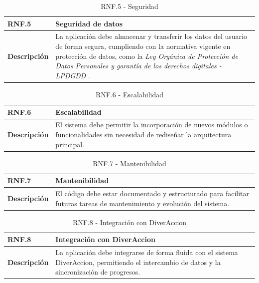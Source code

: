 \begin{table}[H]
\centering
\begin{tabularx}{\textwidth}{|X|p{}|}
\hline
\textbf{RNF.5} & Seguridad de datos \\
\hline
\textbf{Descripción} & La aplicación debe almacenar y transferir los datos del usuario de forma segura, cumpliendo con la normativa vigente en protección de datos, como la \textit{Ley Orgánica de Protección de Datos Personales y garantía de los derechos digitales - LPDGDD} \parencite{rgpd}. \\
\hline
\end{tabularx}
\caption{RNF.5 - Seguridad}
\end{table}

\begin{table}[H]
\centering
\begin{tabularx}{\textwidth}{|X|p{}|}
\hline
\textbf{RNF.6} & Escalabilidad \\
\hline
\textbf{Descripción} & El sistema debe permitir la incorporación de nuevos módulos o funcionalidades sin necesidad de rediseñar la arquitectura principal. \\
\hline
\end{tabularx}
\caption{RNF.6 - Escalabilidad}
\end{table}

\begin{table}[H]
\centering
\begin{tabularx}{\textwidth}{|X|p{}|}
\hline
\textbf{RNF.7} & Mantenibilidad \\
\hline
\textbf{Descripción} & El código debe estar documentado y estructurado para facilitar futuras tareas de mantenimiento y evolución del sistema. \\
\hline
\end{tabularx}
\caption{RNF.7 - Mantenibilidad}
\end{table}

\begin{table}[H]
\centering
\begin{tabularx}{\textwidth}{|X|p{}|}
\hline
\textbf{RNF.8} & Integración con DiverAccion \\
\hline
\textbf{Descripción} & La aplicación debe integrarse de forma fluida con el sistema DiverAccion, permitiendo el intercambio de datos y la sincronización de progresos. \\
\hline
\end{tabularx}
\caption{RNF.8 - Integración con DiverAccion}
\end{table}

